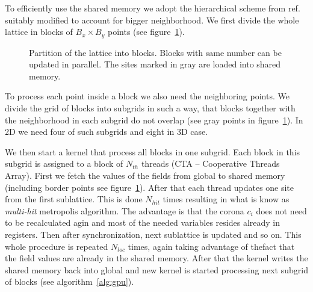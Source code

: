 \documentclass[a4paper]{llncs}
\newcommand{\fillblockgray}[2]{
\pgfmathtruncatemacro\llx{\bksize*(#1)-2}
\pgfmathtruncatemacro\lly{\bksize*(#2)-2}
\pgfmathtruncatemacro\urx{\bksize*(#1+1)+1}
\pgfmathtruncatemacro\ury{\bksize*(#2+1)+1}
\foreach \x in {\llx, ..., \urx}
  \foreach \y in {\lly,...,\ury} {
    \fill[gray] (\x, \y) circle(.25);
  }
}
\newcommand{\npartition}[3]{
\pgfmathtruncatemacro\row{Mod(#2,4)}
\ifnum \row = 0
   \pgfmathtruncatemacro\num{Mod(#1,4)}
\else \ifnum \row  = 1
   \pgfmathtruncatemacro\num{Mod(#1,4)+4}
\else \ifnum \row  = 2
   \pgfmathtruncatemacro\num{Mod(Mod(#1,4)+2,4)}
\else \ifnum \row  = 3
   \pgfmathtruncatemacro\num{Mod(Mod(#1,4)+2,4)+4}
\fi
\fi
\fi
\fi
\ifnum \num = #3
\fill[black] (#1, #2) circle(0.35);
\fi

}
\newcommand{\markpartition}[3]{
\pgfmathtruncatemacro\llx{\bksize*(#1)}
\pgfmathtruncatemacro\lly{\bksize*(#2)}
\pgfmathtruncatemacro\urx{\bksize*(#1+1)-1}
\pgfmathtruncatemacro\ury{\bksize*(#2+1)-1}
\foreach \x in {\llx, ..., \urx}
  \foreach \y in {\lly,...,\ury} {
    \npartition{\x}{\y}{#3}
  }
}
\def\bksize{8}
\def\bkcount{4}
\def\lcsize{5}
\begin{document}
To efficiently use the shared memory  we adopt the hierarchical scheme from
ref.~\cite{weigel} suitably modified to account for bigger
neighborhood.  We first divide the whole lattice in blocks of
$B_x\times B_y$ points (see figure~\ref{fig:blocks}). 
\begin{figure} 
\begin{center}

\end{center}
\caption{\label{fig:blocks}Partition of the lattice into
  blocks. Blocks with same number can be updated in parallel. The sites 
marked in gray are loaded into shared memory.}
\end{figure}
To process each point inside a block we also need the neighboring
points.  We divide the grid of blocks into subgrids in such a way,
that blocks together with the neighborhood in each subgrid do not
overlap (see gray points in figure~\ref{fig:blocks}). In 2D we need
four of such subgrids and eight in 3D case.

We then start a kernel that process all blocks in one subgrid.  Each
block in this subgrid is assigned to a block of $N_{th}$ threads (CTA
-- Cooperative Threads Array). First we fetch the values of the fields
from global to shared memory (including border points see
figure~\ref{fig:blocks}).  After that each thread updates one site
from the first sublattice. This is done $N_{hit}$ times resulting in
what is know as {\em multi-hit} metropolis algorithm. The advantage is
that the corona $c_i$ does not need to be recalculated agin and most
of the needed variables resides already in registers.  Then after
synchronization, next sublattice is updated and so on. This whole
procedure is repeated $N_{loc}$ times, again taking advantage of
thefact that the field values are already in the shared memory.  After
that the kernel writes the shared memory back into global and new
kernel is started processing next subgrid of blocks (see
algorithm~\ref{alg:gpu}).
\end{document}
